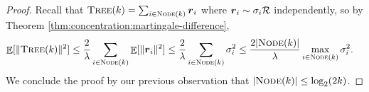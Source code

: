 \ThmTreeNoise*

\begin{proof}
Recall that ${\normalfont\textsc{Tree}}(k)=\sum_{i\in {\normalfont\textsc{Node}}(k)}{\boldsymbol{r}}_i$ where ${\boldsymbol{r}}_i\sim \sigma_i{\cal R}$ independently, so by Theorem \ref{thm:concentration:martingale-difference},
\begin{align*}
    \mathop{\mathbb{E}}[\|{\normalfont\textsc{Tree}}(k)\|^2]
    &\le \frac{2}{\lambda}\sum_{i\in {\normalfont\textsc{Node}}(k)} \mathop{\mathbb{E}}[\|{\boldsymbol{r}}_i\|^2] 
    \le \frac{2}{\lambda} \sum_{i\in {\normalfont\textsc{Node}}(k)} \sigma_i^2
    \le \frac{2|{\normalfont\textsc{Node}}(k)|}{\lambda} \max_{i\in{\normalfont\textsc{Node}}(k)} \sigma_i^2.
\end{align*}
We conclude the proof by our previous observation that $|{\normalfont\textsc{Node}}(k)|\le \log_2(2k)$.
\end{proof}
